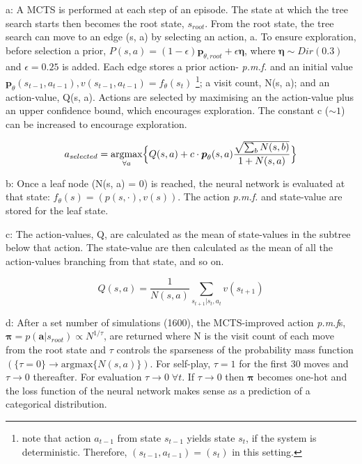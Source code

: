 \documentclass[../main.tex]{subfiles}
\begin{document}
a:
A MCTS is performed at each step of an episode. The state at which the tree search starts then becomes the root state, $s_{root}$. From the root state, the tree search can move to an edge (s, a) by selecting an action, a. To ensure exploration, before selection a prior, $P(s, a) = (1-\epsilon)\boldsymbol{p}_{\theta, root} + \epsilon \boldsymbol{\eta}$, where $\boldsymbol{\eta} \sim Dir(0.3)$ and $\epsilon = 0.25$ is added. Each edge stores a prior action- \textit{p.m.f.} and an initial value $\boldsymbol{p}_\theta (s_{t-1}, a_{t-1}), v(s_{t-1}, a_{t-1}) =f_\theta(s_t)$ \footnote{note that action $a_{t-1}$ from state $s_{t-1}$ yields state $s_t$, if the system is deterministic. Therefore, $(s_{t-1}, a_{t-1}) = (s_t)$ in this setting.}; a visit count, N(s, a); and an action-value, Q(s, a). Actions are selected by maximising an the action-value plus an upper confidence bound, which encourages exploration. The constant c ($\sim 1$) can be increased to encourage exploration.

\begin{equation}
   a_{selected} = \underset{\forall a}{\text{argmax}} \Big{\{}Q(s, a) + c \cdot\boldsymbol{p}_\theta (s, a)\frac{\sqrt{\sum_b N(s, b)}}{1 + N(s, a)}\Big{\}}
   \label{eqn:ucb}
\end{equation}

b:
Once a leaf node (N(s, a) = 0) is reached, the neural network is evaluated at that state: $f_\theta (s) = (p(s, \cdot), v(s))$. The action \textit{p.m.f.} and state-value are stored for the leaf state.

c:
The action-values, Q, are calculated as the mean of state-values in the subtree below that action. The state-value are then calculated as the mean of all the action-values branching from that state, and so on.

\begin{equation}
   Q(s, a) = \frac{1}{N(s, a)} \sum_{s_{t+1} | s_t, a_t} v(s_{t+1})
   \label{eqn:actionvalue}
\end{equation} 

d:
After a set number of simulations (1600), the MCTS-improved action \textit{p.m.f}s, $\boldsymbol{\pi} = p(\boldsymbol{a} | s_{root}) \propto N^{1/\tau}$, are returned where N is the visit count of each move from the root state and $\tau$ controls the sparseness of the probability mass function $(\{\tau = 0\} \rightarrow \text{argmax}\{N(s, a)\})$. For self-play, $\tau = 1$ for the first 30 moves and $\tau \rightarrow 0$ thereafter. For evaluation $\tau \rightarrow 0 \; \forall t$. If $\tau \rightarrow 0$ then $\boldsymbol{\pi}$ becomes one-hot and the loss function of the neural network makes sense as a prediction of a categorical distribution.
\end{document}
